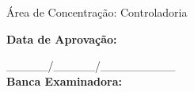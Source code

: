 \begin{folhadeaprovacao}
  \begin{center}
    {\normalsize \MakeUppercase{\imprimirautor}}
        \vspace*{2.5cm}
    \begin{center}
      \normalsize \textbf{\imprimirtitulo}
    \end{center}
    \vspace*{2.5cm}
    \hspace{.45\textwidth}
    \begin{minipage}{.5\textwidth}
        \imprimirpreambulo
        \par
        Área de Concentração: Controladoria
    \end{minipage}%
  \end{center}
  \vspace*{2cm}
\centering
  \textbf{Data de Aprovação:}\\
  \par
  \_\_\_\_\_/\_\_\_\_\_/\_\_\_\_\_\_\_\_\_ \\
  \vspace{1.5cm}
  \textbf{Banca Examinadora:}
  \assinatura{\textbf{\titulacaoorientador \ \imprimirorientador} \\ \imprimirorientadorRotulo} 
\end{folhadeaprovacao}